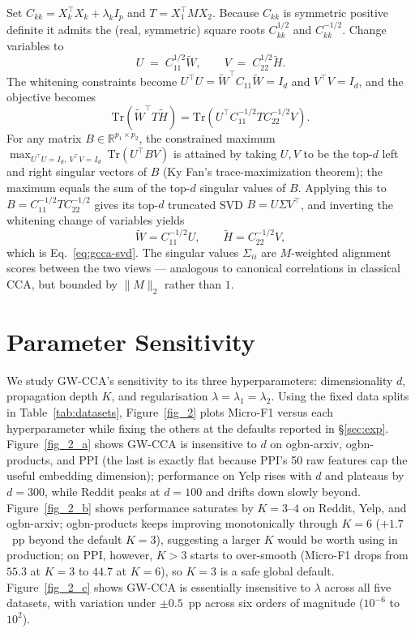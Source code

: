 \documentclass{article}
\begin{document}
Set $C_{kk} = X_k^\top X_k + \lambda_k I_p$ and $T = X_1^\top M X_2$.
Because $C_{kk}$ is symmetric positive definite it admits the (real,
symmetric) square roots $C_{kk}^{1/2}$ and $C_{kk}^{-1/2}$. Change
variables to
\[
U \;=\; C_{11}^{1/2} \widetilde{W}, \qquad
V \;=\; C_{22}^{1/2} \widetilde{H}.
\]
The whitening constraints become
$U^\top U = \widetilde{W}^\top C_{11} \widetilde{W} = I_d$ and $V^\top V = I_d$,
and the objective becomes
\begin{equation*}
\mathrm{Tr}\!\left(\widetilde{W}^\top T \widetilde{H}\right)
= \mathrm{Tr}\!\left(U^\top C_{11}^{-1/2} T C_{22}^{-1/2} V\right).
\end{equation*}
For any matrix $B \in \mathbb{R}^{p_1 \times p_2}$, the constrained
maximum
$\max_{U^\top U = I_d,\ V^\top V = I_d}\ \mathrm{Tr}(U^\top B V)$
is attained by taking $U, V$ to be the top-$d$ left and right singular
vectors of $B$ (Ky Fan's trace-maximization theorem); the maximum equals
the sum of the top-$d$ singular values of $B$. Applying this to
$B = C_{11}^{-1/2} T C_{22}^{-1/2}$ gives its top-$d$ truncated SVD
$B = U \Sigma V^\top$, and inverting the whitening change of variables
yields
\[
\widetilde{W} = C_{11}^{-1/2} U, \qquad
\widetilde{H} = C_{22}^{-1/2} V,
\]
which is Eq.~\ref{eq:gcca-svd}. The singular values $\Sigma_{ii}$ are
$M$-weighted alignment scores between the two views --- analogous to
canonical correlations in classical CCA, but bounded by $\|M\|_2$ rather
than $1$.

\section{Parameter Sensitivity}
\label{app:sensitivity}

We study GW-CCA's sensitivity to its three hyperparameters: dimensionality
$d$, propagation depth $K$, and regularisation $\lambda = \lambda_1 =
\lambda_2$. Using the fixed data splits in Table~\ref{tab:datasets},
Figure~\ref{fig_2} plots Micro-F1 versus each hyperparameter while fixing
the others at the defaults reported in \S\ref{sec:exp}. Figure~\ref{fig_2_a}
shows GW-CCA is insensitive to $d$ on ogbn-arxiv, ogbn-products, and PPI
(the last is exactly flat because PPI's 50 raw features cap the useful
embedding dimension); performance on Yelp rises with $d$ and plateaus by
$d = 300$, while Reddit peaks at $d = 100$ and drifts down slowly beyond.
Figure~\ref{fig_2_b} shows performance saturates by $K = 3$--$4$ on
Reddit, Yelp, and ogbn-arxiv; ogbn-products keeps improving monotonically
through $K = 6$ ($+1.7$~pp beyond the default $K = 3$), suggesting a
larger $K$ would be worth using in production; on PPI, however, $K > 3$
starts to over-smooth (Micro-F1 drops from $55.3$ at $K = 3$ to $44.7$ at
$K = 6$), so $K = 3$ is a safe global default. Figure~\ref{fig_2_c} shows
GW-CCA is essentially insensitive to $\lambda$ across all five datasets,
with variation under $\pm 0.5$~pp across six orders of magnitude
($10^{-6}$ to $10^{2}$).
\end{document}
